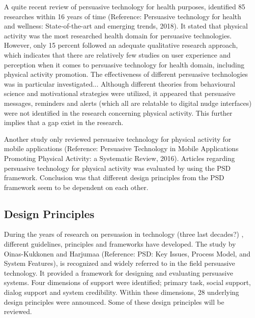 A quite recent review of persuasive technology for health purposes, identified 85 researches within 16 years of time (Reference: Persuasive technology for health and wellness: State-of-the-art and emerging trends, 2018). It stated that physical activity was the most researched health domain for persuasive technologies. However, only 15 percent followed an adequate qualitative research approach, which indicates that there are relatively few studies on user experience and perception when it comes to persuasive technology for health domain, including physical activity promotion. The effectiveness of different persuasive technologies was in particular investigated... 
Although different theories from behavioural science and motivational strategies were utilized, it appeared that persuasive messages, reminders and alerts (which all are relatable to digital nudge interfaces) were not identified in the research concerning physical activity. This further implies that a gap exist in the research.

Another study only reviewed persuasive technology for physical activity for mobile applications (Reference: Persuasive Technology in Mobile Applications Promoting Physical Activity: a Systematic Review, 2016). Articles regarding persuasive technology for physical activity was evaluated by using the PSD framework. Conclusion was that different design principles from the PSD framework seem to be dependent on each other. 

\subsection{Design Principles}
During the years of research on persuasion in technology (three last decades?) , different guidelines, principles and frameworks have developed. The study by Oinas-Kukkonen and Harjumaa (Reference: PSD: Key Issues, Process Model, and System Features), is recognized and widely referred to in the field persuasive technology. It provided a framework for designing and evaluating persuasive systems. Four dimensions of support were identified; primary task, social support, dialog support and system credibility. Within these dimensions, 28 underlying design principles were announced. Some of these design principles will be reviewed. 

